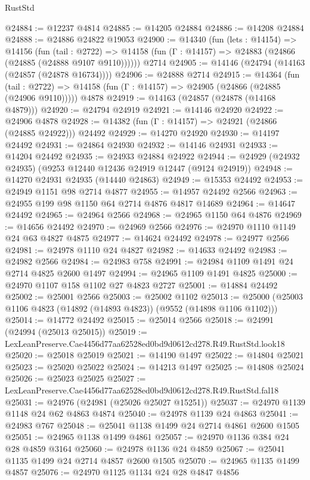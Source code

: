\begin{lexlean}{RustStd}
\begin{coremodule}
@24884 := @12237 @4814
@24885 := @14205 @24884
@24886 := @14208 @24884
@24888 := @24886 @24822 @19053
@24900 := @14340
    (fun (lets : @14154) =>
    @14156
      (fun (tail : @2722) =>
      @14158 (fun (Γ : @14157) => @24883 (@24866 (@24885 (@24888 @9107 @9110))))))
    @2714
@24905 := @14146 (@24794 (@14163 (@24857 (@24878 @16734))))
@24906 := @24888 @2714
@24915 := @14364
    (fun (tail : @2722) => @14158 (fun (Γ : @14157) => @24905 (@24866 (@24885 (@24906 @9110)))))
    @4878
@24919 := @14163 (@24857 (@24878 (@14168 @4879)))
@24920 := @24794 @24919
@24921 := @14146 @24920
@24922 := @24906 @4878
@24928 := @14382 (fun (Γ : @14157) => @24921 (@24866 (@24885 @24922))) @24492
@24929 := @14270 @24920
@24930 := @14197 @24492
@24931 := @24864 @24930
@24932 := @14146 @24931
@24933 := @14204 @24492
@24935 := @24933 @24884 @24922
@24944 := @24929 (@24932 @24935) (@9253 @12440 @12436 @24919 @12447 (@9124 @24919))
@24948 := @14270 @24931 @24935 (@14440 @24863)
@24949 := @15353 @24492
@24953 := @24949 @1151 @98 @2714 @4877
@24955 := @14957 @24492 @2566
@24963 := @24955 @199 @98 @1150 @64 @2714 @4876 @4817 @14689
@24964 := @14647 @24492
@24965 := @24964 @2566
@24968 := @24965 @1150 @64 @4876
@24969 := @14656 @24492
@24970 := @24969 @2566
@24976 := @24970 @1110 @1149 @24 @63 @4827 @4875
@24977 := @14624 @24492
@24978 := @24977 @2566
@24981 := @24978 @1110 @24 @4827
@24982 := @14633 @24492
@24983 := @24982 @2566
@24984 := @24983 @758
@24991 := @24984 @1109 @1491 @24 @2714 @4825 @2600 @1497
@24994 := @24965 @1109 @1491 @4825
@25000 := @24970 @1107 @158 @1102 @27 @4823 @2727
@25001 := @14884 @24492
@25002 := @25001 @2566
@25003 := @25002 @1102
@25013 := @25000 (@25003 @1106 @4823 (@14892 (@14893 @4823)) (@9552 (@14898 @1106 @1102)))
@25014 := @14772 @24492
@25015 := @25014 @2566
@25018 := @24991 (@24994 (@25013 @25015))
@25019 := LexLeanPreserve.Cae4456d77aa62528ed0bd9d0612cd278.R49.RustStd.look18
@25020 := @25018 @25019
@25021 := @14190 @1497
@25022 := @14804 @25021
@25023 := @25020 @25022
@25024 := @14213 @1497
@25025 := @14808 @25024
@25026 := @25023 @25025
@25027 := LexLeanPreserve.Cae4456d77aa62528ed0bd9d0612cd278.R49.RustStd.fal18
@25031 := @24976 (@24981 (@25026 @25027 @15251))
@25037 := @24970 @1139 @1148 @24 @62 @4863 @4874
@25040 := @24978 @1139 @24 @4863
@25041 := @24983 @767
@25048 := @25041 @1138 @1499 @24 @2714 @4861 @2600 @1505
@25051 := @24965 @1138 @1499 @4861
@25057 := @24970 @1136 @384 @24 @28 @4859 @3164
@25060 := @24978 @1136 @24 @4859
@25067 := @25041 @1135 @1499 @24 @2714 @4857 @2600 @1505
@25070 := @24965 @1135 @1499 @4857
@25076 := @24970 @1125 @1134 @24 @28 @4847 @4856

\end{coremodule}
\end{lexlean}

